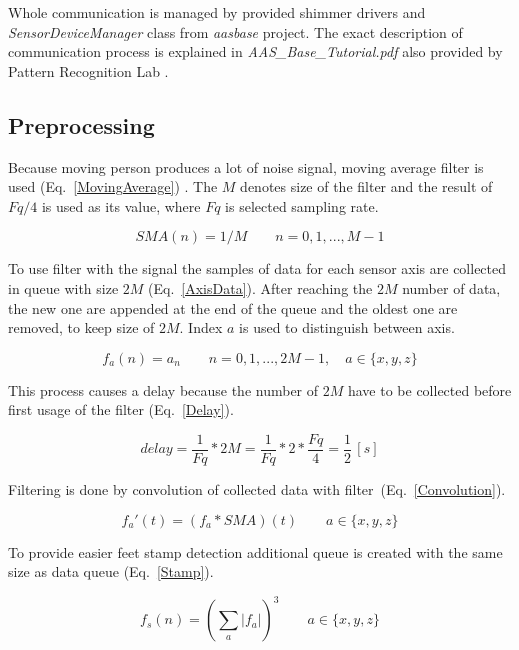 \documentclass[conference]{IEEEtran}
\begin{document}
Whole communication is managed by provided shimmer drivers and \emph{SensorDeviceManager} class from \emph{aasbase} project. The exact description of communication process is explained in \emph{AAS\_Base\_Tutorial.pdf} also provided by Pattern Recognition Lab \cite{CS5}.


\subsection{Preprocessing}
Because moving person produces a lot of noise signal, moving average filter is used (Eq.~\ref{MovingAverage}) \cite{MovingAverage}.
The $M$ denotes size of the filter and the result of $Fq/4$ is used as its value, where $Fq$ is selected sampling rate.

\begin{equation}
	SMA(n) = 1/M\qquad  n = 0, 1, ..., M - 1
	\label{MovingAverage}
\end{equation}

To use filter with the signal the samples of data for each sensor axis are collected in queue with size  $2M$ (Eq.~\ref{AxisData}).
After reaching the $2M$ number of data, the new one are appended at the end of the queue and the oldest one are removed, to keep size of $2M$.
Index $a$ is used to distinguish between axis.

\begin{equation}
    f_a(n) = a_n\qquad n = 0, 1, ..., 2M - 1,\quad a \in \{x, y, z\}
    \label{AxisData}
\end{equation}

This process causes a delay because the number of $2M$ have to be collected before first usage of the filter (Eq.~\ref{Delay}).

\begin{equation}
    delay = \frac{1}{Fq} * 2M = \frac{1}{Fq} * 2 * \frac{Fq}{4} = \frac{1}{2}\,[s]
    \label{Delay}
\end{equation}

Filtering is done by convolution of collected data with filter~(Eq.~\ref{Convolution}).

\begin{equation}
    f_a'(t) = (f_a \ast SMA)(t) \qquad a \in \{x, y, z\}
    \label{Convolution}
\end{equation}

To provide easier feet stamp detection additional queue is created with the same size as data queue (Eq.~\ref{Stamp}).

\begin{equation}
    f_s(n) = \left(\sum\limits_{a} |f_a|\right)^3 \qquad a\in \{x, y, z\}
    \label{Stamp}
\end{equation}
\end{document}

